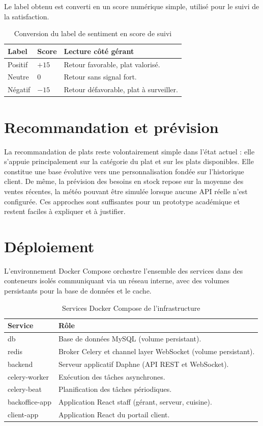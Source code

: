 Le label obtenu est converti en un score numérique simple, utilisé pour le suivi de la satisfaction.

\begin{table}[H]
\centering
\caption{Conversion du label de sentiment en score de suivi}
\begin{tabular}{p{4cm}p{4cm}p{5cm}}
\toprule
\textbf{Label} & \textbf{Score} & \textbf{Lecture côté gérant} \\
\midrule
Positif & $+15$ & Retour favorable, plat valorisé. \\
Neutre & $0$ & Retour sans signal fort. \\
Négatif & $-15$ & Retour défavorable, plat à surveiller. \\
\bottomrule
\end{tabular}
\end{table}

\section{Recommandation et prévision}
La recommandation de plats reste volontairement simple dans l'état actuel : elle s'appuie principalement sur la catégorie du plat et sur les plats disponibles. Elle constitue une base évolutive vers une personnalisation fondée sur l'historique client. De même, la prévision des besoins en stock repose sur la moyenne des ventes récentes, la météo pouvant être simulée lorsque aucune API réelle n'est configurée. Ces approches sont suffisantes pour un prototype académique et restent faciles à expliquer et à justifier.

\section{Déploiement}
L'environnement Docker Compose orchestre l'ensemble des services dans des conteneurs isolés communiquant via un réseau interne, avec des volumes persistants pour la base de données et le cache.

\begin{table}[H]
\centering
\caption{Services Docker Compose de l'infrastructure}
\begin{tabular}{p{4cm}p{9cm}}
\toprule
\textbf{Service} & \textbf{Rôle} \\
\midrule
db & Base de données MySQL (volume persistant). \\
redis & Broker Celery et channel layer WebSocket (volume persistant). \\
backend & Serveur applicatif Daphne (API REST et WebSocket). \\
celery-worker & Exécution des tâches asynchrones. \\
celery-beat & Planification des tâches périodiques. \\
backoffice-app & Application React staff (gérant, serveur, cuisine). \\
client-app & Application React du portail client. \\
\bottomrule
\end{tabular}
\end{table}

